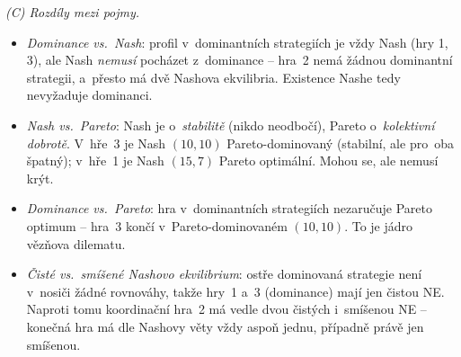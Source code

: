 \noindent\emph{(C) Rozdíly mezi pojmy.}
\begin{itemize}[nosep]
  \item \emph{Dominance vs.\ Nash}: profil v~dominantních strategiích je vždy Nash (hry 1, 3), ale Nash \emph{nemusí} pocházet z~dominance -- hra~2 nemá žádnou dominantní strategii, a~přesto má dvě Nashova ekvilibria. Existence Nashe tedy nevyžaduje dominanci.
  \item \emph{Nash vs.\ Pareto}: Nash je o~\emph{stabilitě} (nikdo neodbočí), Pareto o~\emph{kolektivní dobrotě}. V~hře~3 je Nash $(10,10)$ Pareto-dominovaný (stabilní, ale pro~oba špatný); v~hře~1 je Nash $(15,7)$ Pareto optimální. Mohou se, ale nemusí krýt.
  \item \emph{Dominance vs.\ Pareto}: hra v~dominantních strategiích nezaručuje Pareto optimum -- hra~3 končí v~Pareto-dominovaném $(10,10)$. To je jádro vězňova dilematu.
  \item \emph{Čisté vs.\ smíšené Nashovo ekvilibrium}: ostře dominovaná strategie není v~nosiči žádné rovnováhy, takže hry~1 a~3 (dominance) mají jen čistou NE. Naproti tomu koordinační hra~2 má vedle dvou čistých i~smíšenou NE -- konečná hra má dle Nashovy věty vždy aspoň jednu, případně právě jen smíšenou.
\end{itemize}
